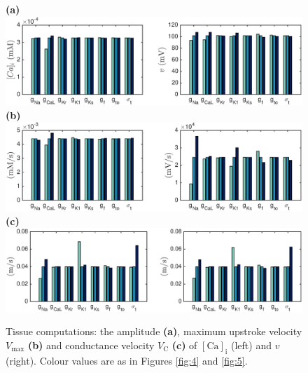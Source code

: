\documentclass{article}
\begin{document}
\begin{figure}
 \textbf{(a)}  \includegraphics[trim=1cm 0cm 2cm 0cm, clip=true, width=1\linewidth]{amplitude} 
 \textbf{(b)}  \includegraphics[trim=1cm 0cm 2cm 0cm, clip=true, width=1\linewidth]{v_max} 
 \textbf{(c)}   \includegraphics[trim=1cm 0cm 2cm 0cm, clip=true, width=1\linewidth]{V_C} 
    \caption{Tissue computations: the amplitude \textbf{(a)}, maximum upstroke velocity $V_{\mathrm{max}}$ \textbf{(b)} and conductance velocity $V_{\mathrm{C}}$ \textbf{(c)} of $[\mathrm{Ca}]_{\mathrm{i}}$ (left) and $v$ (right).  Colour values are as in Figures \ref{fig:4} and \ref{fig:5}.}
    \label{fig:6}
\end{figure}
%
\end{document}

